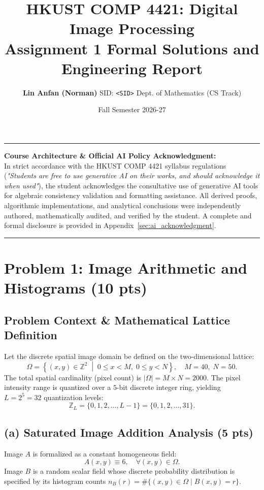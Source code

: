\documentclass[11pt,a4paper]{article}
\title{\vspace{-1.2cm}\LARGE\textbf{HKUST COMP 4421: Digital Image Processing}\\[0.3em]
\Large\textbf{Assignment 1 Formal Solutions and Engineering Report}}
\author{\textbf{Lin Anfan (Norman)} \quad SID: \texttt{<SID>} \quad Dept. of Mathematics (CS Track)}
\date{Fall Semester 2026-27}
\begin{document}
\maketitle
\thispagestyle{fancy}

\hrule
\vspace{0.7em}
\noindent\textbf{Course Architecture \& Official AI Policy Acknowledgment:}\\
In strict accordance with the HKUST COMP 4421 syllabus regulations (\textit{"Students are free to use generative AI on their works, and should acknowledge it when used"}), the student acknowledges the consultative use of generative AI tools for algebraic consistency validation and formatting assistance. All derived proofs, algorithmic implementations, and analytical conclusions were independently authored, mathematically audited, and verified by the student. A complete and formal disclosure is provided in Appendix~\ref{sec:ai_acknowledgment}.
\vspace{0.5em}
\hrule
\vspace{1.2em}

\section{Problem 1: Image Arithmetic and Histograms (10 pts)}

\subsection{Problem Context \& Mathematical Lattice Definition}
Let the discrete spatial image domain be defined on the two-dimensional lattice:
\begin{equation}
\Omega = \left\{ (x, y) \in \mathbb{Z}^2 \;\middle|\; 0 \le x < M, \; 0 \le y < N \right\}, \quad M = 40, \; N = 50.
\end{equation}
The total spatial cardinality (pixel count) is $|\Omega| = M \times N = 2000$. The pixel intensity range is quantized over a $5$-bit discrete integer ring, yielding $L = 2^5 = 32$ quantization levels:
\begin{equation}
\mathbb{Z}_L = \{0, 1, 2, \dots, L-1\} = \{0, 1, 2, \dots, 31\}.
\end{equation}

\subsection{(a) Saturated Image Addition Analysis (5 pts)}
Image $A$ is formalized as a constant homogeneous field:
\begin{equation}
A(x, y) \equiv 6, \quad \forall (x, y) \in \Omega.
\end{equation}
Image $B$ is a random scalar field whose discrete probability distribution is specified by its histogram counts $n_B(r) = \#\{(x, y) \in \Omega \mid B(x, y) = r\}$.
\end{document}
